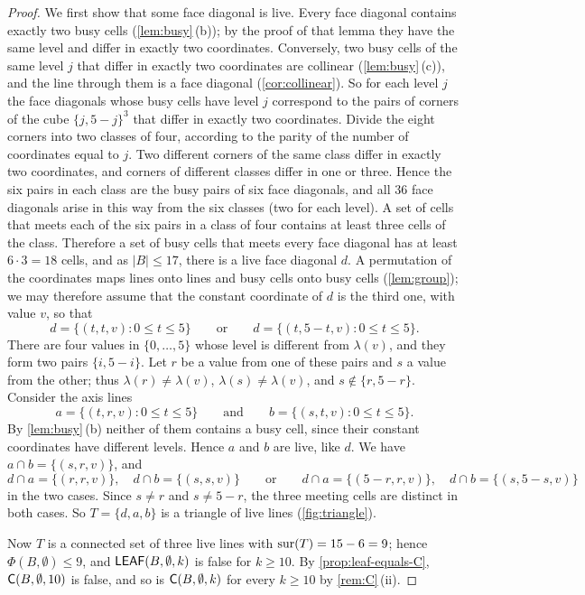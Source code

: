 \begin{proof}
We first show that some face diagonal is live. Every face diagonal contains exactly two busy cells
(\cref{lem:busy}\,(b)); by the proof of that lemma they have the same level and differ in exactly two
coordinates. Conversely, two busy cells of the same level $j$ that differ in exactly two coordinates
are collinear (\cref{lem:busy}\,(c)), and the line through them is a face diagonal (\cref{cor:collinear}).
So for each level $j$ the face diagonals whose busy cells have level $j$ correspond to the pairs of corners
of the cube $\{j,5-j\}^3$ that differ in exactly two coordinates. Divide the eight corners into two classes
of four, according to the parity of the number of coordinates equal to $j$. Two different corners of the
same class differ in exactly two coordinates, and corners of different classes differ in one or three.
Hence the six pairs in each class are the busy pairs of six face diagonals, and all $36$ face diagonals
arise in this way from the six classes (two for each level). A set of cells that meets each of the six
pairs in a class of four contains at least three cells of the class. Therefore a set of busy cells that
meets every face diagonal has at least $6\cdot 3=18$ cells, and as $|B|\le 17$, there is a live face
diagonal $d$. A permutation of the coordinates
maps lines onto lines and busy cells onto busy cells (\cref{lem:group}); we may therefore assume that the
constant coordinate of $d$ is the third one, with value $v$, so that
\[
  d=\{(t,t,v):0\le t\le 5\}\qquad\text{or}\qquad d=\{(t,5-t,v):0\le t\le 5\}.
\]
There are four values in $\{0,\dots,5\}$ whose level is different from $\lambda(v)$, and they form two
pairs $\{i,5-i\}$. Let $r$ be a value from one of these pairs and $s$ a value from the other; thus
$\lambda(r)\ne\lambda(v)$, $\lambda(s)\ne\lambda(v)$, and $s\notin\{r,5-r\}$. Consider the axis lines
\[
  a=\{(t,r,v):0\le t\le 5\}\qquad\text{and}\qquad b=\{(s,t,v):0\le t\le 5\}.
\]
By \cref{lem:busy}\,(b) neither of them contains a busy cell, since their constant coordinates have
different levels. Hence $a$ and $b$ are live, like $d$. We have $a\cap b=\{(s,r,v)\}$, and
\[
  d\cap a=\{(r,r,v)\},\quad d\cap b=\{(s,s,v)\}\qquad\text{or}\qquad
  d\cap a=\{(5-r,r,v)\},\quad d\cap b=\{(s,5-s,v)\}
\]
in the two cases. Since $s\ne r$ and $s\ne 5-r$, the three meeting cells are distinct in both cases. So
$T=\{d,a,b\}$ is a triangle of live lines (\cref{fig:triangle}).

Now $T$ is a connected set of three live lines with $\operatorname{sur}(T)=15-6=9$; hence $\Phi(B,\emptyset)\le 9$, and
$\mathsf{LEAF}(B,\emptyset,k)$ is false for $k\ge 10$. By \cref{prop:leaf-equals-C}, $\mathsf{C}(B,\emptyset,10)$ is false,
and so is $\mathsf{C}(B,\emptyset,k)$ for every $k\ge 10$ by \cref{rem:C}\,(ii).
\end{proof}

